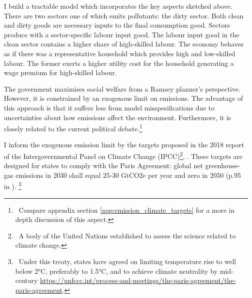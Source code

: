 I build a tractable model which incorporates the key aspects sketched above. There are two sectors one of which emits pollutants: the dirty sector. Both clean and dirty goods are necessary inputs to the final consumption good. Sectors produce with a sector-specific labour input good. The labour input good in the clean sector contains a higher share of high-skilled labour. 
The economy behaves as if there was a representative household which provides high and low-skilled labour. The former exerts a higher utility cost for the household generating a wage premium for high-skilled labour. 

The government maximises social welfare from a Ramsey planner's perspective. However, it is constrained by an exogenous limit on emissions. The advantage of this approach is that it suffers less from  model misspesifications due to  uncertainties about how emissions affect the environment. Furthermore, it is closely related to the current political debate.\footnote{\ Compare appendix section \ref{app:emission_climate_targets} for a more in depth discussion of this aspect. } 

I inform the exogenous emission limit by the  targets proposed in the 2018 report of the Intergovernmental Panel on Climate Change (IPCC)\footnote{\ A body of the United Nations established to assess the science related to climate change.},  \cite{Rogelj2018MitigationDevelopment.}. These targets are designed for states to comply with the Paris Agreement: global net greenhouse-gas emissions in 2030 shall equal 25-30 GtCO2e per year and zero in 2050 (p.95 in \cite{Rogelj2018MitigationDevelopment.}).%
\footnote{\ Under this treaty, states have agreed on limiting temperature rise to well below 2°C, preferably to 1.5°C, and to achieve climate neutrality by mid-century \url{https://unfccc.int/process-and-meetings/the-paris-agreement/the-paris-agreement}. }

